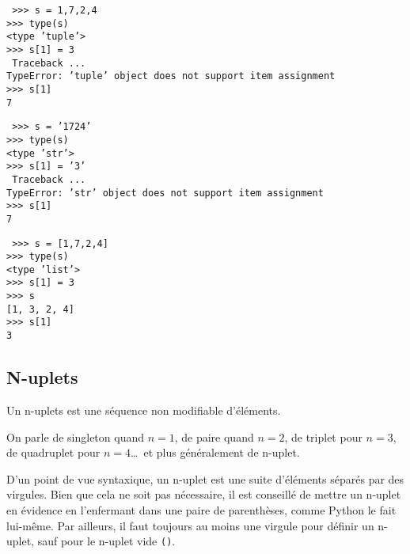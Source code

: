 \noindent\mbox{}\hspace*{1cm}\begin{py}{4cm}\tt
>>> s = 1,7,2,4\\
>>> type(s)\\
<type 'tuple'>\\
>>> s[1] = 3\\
{\color{red}
Traceback ...\\
TypeError: 'tuple' object does not support item assignment
}\\
>>> s[1]\\
7
\end{py}
\hfill
\begin{py}{4cm}\tt
>>> s = '1724'\\
>>> type(s)\\
<type 'str'>\\
>>> s[1] = '3'\\
{\color{red}
Traceback ...\\
TypeError: 'str' object does not support item assignment
}\\
>>> s[1]\\
7
\end{py}
\hfill
\begin{py}{4cm}\tt
>>> s = [1,7,2,4]\\
>>> type(s)\\
<type 'list'>\\
>>> s[1] = 3\\
>>> s\\
\mbox{}[1, 3, 2, 4]\\
>>> s[1]\\
3
\end{py}

\subsection{N-uplets}
\begin{defin}[n-uplet]
Un n-uplets est une séquence non modifiable d'élé\-ments.
\end{defin}
On parle de singleton quand $n=1$, de paire quand $n=2$, de triplet pour $n=3$, 
de quadruplet pour $n=4$\dots\ et plus généralement de n-uplet.

D'un point de vue syntaxique, un n-uplet est une suite d'éléments
séparés par des virgules. Bien que cela ne soit pas nécessaire, il est  
conseillé de mettre un n-uplet en évidence en l'enfermant dans une paire de parenthèses, 
comme {\sc Python} le fait lui-même.
Par ailleurs, il faut toujours au moins une virgule pour définir un n-uplet, sauf pour le n-uplet vide {\tt ()}.

